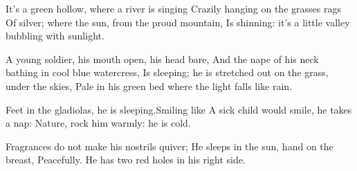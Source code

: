 It’s a green hollow, where a river is singing
Crazily hanging on the grasses rags
Of silver; where the sun, from the proud mountain,
Is shinning: it’s a little valley bubbling with sunlight.

A young soldier, his mouth open, his head bare,
And the nape of his neck bathing in cool blue watercress,
Is sleeping; he is stretched out on the grass, under the skies,
Pale in his green bed where the light falls like rain.

Feet in the gladiolas, he is sleeping.Smiling like
A sick child would smile, he takes a nap:
Nature, rock him warmly: he is cold.

Fragrances do not make his nostrils quiver;
He sleeps in the sun, hand on the breast,
Peacefully. He has two red holes in his right side.
